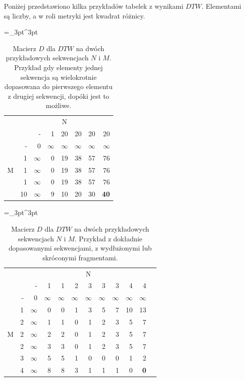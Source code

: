 Poniżej przedstawiono kilka przykładów tabelek z wynikami $DTW$. Elementami są liczby, a w roli metryki jest kwadrat różnicy.

\begin{table}[H]
    \caption{Macierz $D$ dla $DTW$ na dwóch przykładowych sekwencjach $N$ i $M$. Przykład gdy elementy jednej sekwencja są wielokrotnie dopasowana do pierwszego elementu z drugiej sekwencji, dopóki jest to możliwe.}
    \centering
    \label{tab:dtw_example0}
    \small
    \tabulinesep =_3pt^3pt
    \begin{tabu}{r*{7}{r}}
         & & 
        \\
        & & - & 1 & 20 & 20 & 20 & 20
        \\ \midrule
         & - & 0 & $\infty$ & $\infty$ & $\infty$ & $\infty$ & $\infty$
        \\ 
        & 1 & $\infty$ & 0 & 19 & 38 & 57 & 76
        \\
        & 1 & $\infty$ & 0 & 19 & 38 & 57 & 76
        \\
        & 1 & $\infty$ & 0 & 19 & 38 & 57 & 76
        \\
        & 10 & $\infty$ & 9 & 10 & 20 & 30 & \textbf{40}
        \\
    \end{tabu}
\end{table}

\begin{table}[H]
    \caption{Macierz $D$ dla $DTW$ na dwóch przykładowych sekwencjach $N$ i $M$. Przykład z dokładnie dopasowanymi sekwencjami, z wydłużonymi lub skróconymi fragmentami.}
    \centering
    \label{tab:dtw_example1}
    \small
    \tabulinesep =_3pt^3pt
    \begin{tabu}{r*{11}{r}}
         & & 
        \\
        & & - & 1 & 1 & 2 & 3 & 3 & 3 & 4 & 4
        \\ \midrule
         & - & 0 & $\infty$ & $\infty$ & $\infty$ & $\infty$ & $\infty$ & $\infty$ & $\infty$ & $\infty$
        \\
        & 1 & $\infty$ & 0 & 0 & 1 & 3 & 5 & 7 & 10 & 13
        \\
        & 2 & $\infty$ & 1 & 1 & 0 & 1 & 2 & 3 & 5 & 7
        \\
        & 2 & $\infty$ & 2 & 2 & 0 & 1 & 2 & 3 & 5 & 7
        \\
        & 2 & $\infty$ & 3 & 3 & 0 & 1 & 2 & 3 & 5 & 7
        \\
        & 3 & $\infty$ & 5 & 5 & 1 & 0 & 0 & 0 & 1 & 2
        \\
        & 4 & $\infty$ & 8 & 8 & 3 & 1 & 1 & 1 & 0 & \textbf{0}
        \\
    \end{tabu}
\end{table}


